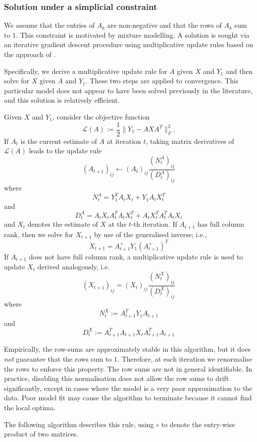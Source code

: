 \documentclass[a4]{article}
\newcommand{\curly}[1]{\mathcal{#1}}
\newcommand{\+}[1]{\mathbf{#1}}
\newcommand{\norm}[1]{\|#1\|}
\begin{document}
\subsubsection{Solution under a simplicial constraint}
We assume that the entries of $A_{k}$ are non-negative and that the rows of $A_{k}$ sum to $1$. This constraint is motivated by mixture modelling. A solution is sought via an iterative gradient descent procedure using multiplicative update rules based on the approach of \cite{lee_algorithms_2001-1}.

Specifically, we derive a multiplicative update rule for $A$ given $X$ and $Y_{1}$ and then solve for $X$ given $A$ and $Y_{1}$. These two steps are applied to convergence. This particular model does not appear to have been solved previously in the literature, and this solution is relatively efficient.

Given $X$ and $Y_{1}$, consider the objective function
\[ \curly{L}(A) := \frac{1}{2}\norm{Y_{1} - AXA^T}^{2}_{F}. \] 
If $A_{t}$ is the current estimate of $A$ at iteration $t$, taking matrix derivatives of $\curly{L}(A)$ leads to the update rule 
\[ (A_{t+1})_{ij} \leftarrow (A_{t})_{ij} \frac{(N^{A}_{t})_{ij}}{(D^{A}_{t})_{ij}} \] where 
\[ N^{A}_{t} = Y_{1}^{T}A_{t}X_{t} + Y_{1}A_{t}X_{t}^{T} \] and
\[ D^{A}_{t} = A_{t} X_{t} A_{t}^T A_{t} X_{t}^T + A_{t} X_{t}^T A_{t}^T A_{t} X_{t} \] and $X_{t}$ denotes the estimate of $X$ at the $t$-th iteration. If $A_{t+1}$ has full column rank, then we solve for $X_{t+1}$ by use of the generalised inverse; i.e., 
\[ X_{t+1} = A_{t+1}^{+}Y_{1}(A_{t+1}^{+})^{T} \] If $A_{t+1}$ does not have full column rank, a multiplicative update rule is used to update $X_{t}$ derived analogously, i.e. 
\[ (X_{t+1})_{ij} = (X_{t})_{ij} \frac{(N^{X}_{t})_{ij}}{(D^{X}_{t})_{ij}} \] where 
\[ N^{X}_{t} := A_{t+1}^{T}Y_{1}A_{t+1} \] and 
\[ D^{X}_{t}:= A_{t+1}^{T}A_{t+1}X_{t}A_{t+1}^{T}A_{t+1} \]  

Empirically, the row-sums are approximately stable in this algorithm, but it does \emph{not} guarantee that the rows sum to $1$. Therefore, at each iteration we renormalise the rows to enforce this property. The row sums are not in general identifiable. In practice, disabling this normalisation does not allow the row sums to drift significantly, except in cases where the model is a very poor approximation to the data. Poor model fit may cause the algorithm to terminate because it cannot find the local optima.

The following algorithm describes this rule, using $\circ$ to denote the entry-wise product of two matrices.
\end{document}
